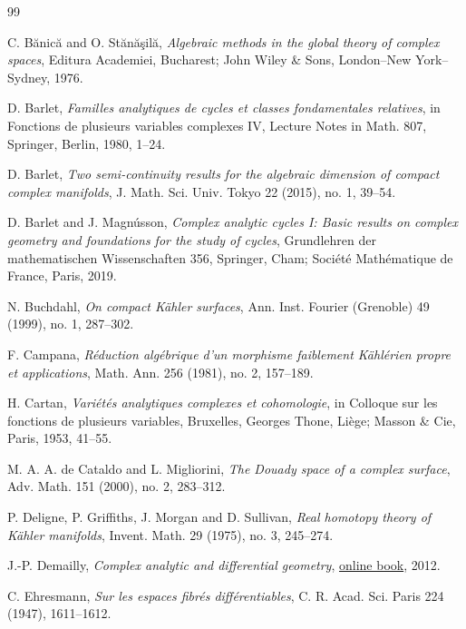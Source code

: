 \documentclass[11pt]{amsart}
\numberwithin{equation}{section}
\theoremstyle{plain}
\theoremstyle{definition}
\begin{document}
\raggedbottom %
\begin{thebibliography}{99}

C. B\u anic\u a and O. St\u an\u a\c sil\u a,
\textit{Algebraic methods in the global theory of complex spaces},
Editura Academiei, Bucharest; John Wiley \& Sons,
London--New York--Sydney, 1976.



D. Barlet,
\textit{Familles analytiques de cycles et classes fondamentales relatives},
in Fonctions de plusieurs variables complexes IV,
Lecture Notes in Math. 807, Springer, Berlin, 1980, 1--24.

D. Barlet,
\textit{Two semi-continuity results for the algebraic dimension of compact
complex manifolds},
J. Math. Sci. Univ. Tokyo 22 (2015), no. 1, 39--54.



D. Barlet and J. Magn\'usson,
\textit{Complex analytic cycles I: Basic results on complex geometry
and foundations for the study of cycles},
Grundlehren der mathematischen Wissenschaften 356,
Springer, Cham; Soci\'et\'e Math\'ematique de France, Paris, 2019.


N. Buchdahl,
\textit{On compact K\"ahler surfaces},
Ann. Inst. Fourier (Grenoble) 49 (1999), no. 1, 287--302.

F. Campana,
\textit{R\'eduction alg\'ebrique d'un morphisme faiblement
K\"ahl\'erien propre et applications},
Math. Ann. 256 (1981), no. 2, 157--189.

H. Cartan,
\textit{Vari\'et\'es analytiques complexes et cohomologie},
in Colloque sur les fonctions de plusieurs variables, Bruxelles,
Georges Thone, Li\`ege; Masson \& Cie, Paris, 1953, 41--55.

M. A. A. de Cataldo and L. Migliorini,
\textit{The Douady space of a complex surface},
Adv. Math. 151 (2000), no. 2, 283--312.

P. Deligne, P. Griffiths, J. Morgan and D. Sullivan,
\textit{Real homotopy theory of K\"ahler manifolds},
Invent. Math. 29 (1975), no. 3, 245--274.

J.-P. Demailly,
\textit{Complex analytic and differential geometry},
\href{https://www-fourier.univ-grenoble-alpes.fr/~demailly/manuscripts/agbook.pdf}{online book}, 2012.

C. Ehresmann,
\textit{Sur les espaces fibr\'es diff\'erentiables},
C. R. Acad. Sci. Paris 224 (1947), 1611--1612.


\end{thebibliography}
\end{document}
